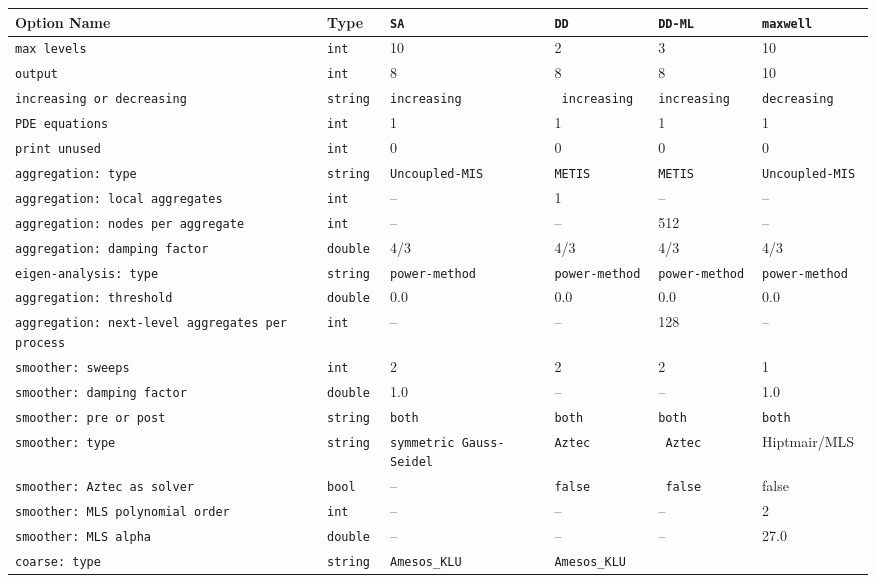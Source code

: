 \documentclass{article}[11pt]
\begin{document}
\begin{table}
  \begin{tabular}{| p{7cm} | p{2.5cm} | p{2.5cm} | p{2.5cm} | p{2.5cm} |
    p{2.5cm} | }
    \hline
    Option Name & Type & {\tt SA} & {\tt DD} & {\tt DD-ML} & \tt maxwell
    \\
    \hline
    \hline
{\tt max levels} & \tt int & 10 & 2 & 3 & 10 \\
\tt output & \tt int & 8 &  8 & 8 & 10 \\
\tt increasing or decreasing & \tt string & \tt increasing & \tt
increasing & \tt increasing & \tt decreasing \\
\tt PDE equations & \tt int & 1 & 1 & 1 & 1 \\
\tt print unused & \tt int & 0 & 0 & 0 & 0 \\
\hline
\hline
\tt aggregation: type & \tt string & \tt Uncoupled-MIS & \tt METIS & \tt METIS &
\tt Uncoupled-MIS \\
\tt aggregation: local aggregates & \tt int & -- & 1 & -- & -- \\
\tt aggregation: nodes per aggregate & \tt int & -- & -- & 512 & -- \\
\tt aggregation: damping factor & \tt double &  4/3 & 4/3 & 4/3 & 4/3\\
\tt eigen-analysis: type & \tt string & \tt power-method & \tt power-method &
                          \tt power-method & \tt power-method \\
\tt aggregation: threshold & \tt double & 0.0 & 0.0 & 0.0 & 0.0\\
\tt aggregation: next-level aggregates per process & \tt int & -- & --
&128 & --\\
\hline
\hline
\tt smoother: sweeps & \tt int & 2 & 2 & 2 & 1 \\
\tt smoother: damping factor & \tt double & 1.0  & -- & --  & 1.0 \\
\tt smoother: pre or post & \tt string & \tt both & \tt both & \tt both
& \tt both \\
\tt smoother: type & \tt string & \tt symmetric Gauss-Seidel & \tt Aztec & \tt
Aztec & Hiptmair/MLS \\
\tt smoother: Aztec as solver & \tt bool & -- & \tt false & \tt
false & false \\
\tt smoother: MLS polynomial order & \tt int & -- & -- & -- & 2 \\
\tt smoother: MLS alpha & \tt double & -- & -- & -- & 27.0 \\
\hline
\hline
\tt coarse: type & \tt string & \tt Amesos\_KLU & \tt Amesos\_KLU  & \tt

\end{tabular}
\end{table}
\end{document}
